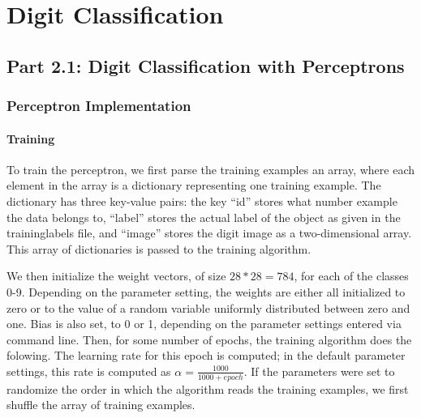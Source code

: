 \section{Digit Classification}
\subsection{Part 2.1: Digit Classification with Perceptrons}
\subsubsection{Perceptron Implementation}
\paragraph{Training}
To train the perceptron, we first parse the training examples an array, where each element in the array is a dictionary representing one training example. The dictionary has three key-value pairs: the key ``id'' stores what number example the data belongs to, ``label'' stores the actual label of the object as given in the traininglabels file, and ``image'' stores the digit image as a two-dimensional array. This array of dictionaries is passed to the training algorithm.

We then initialize the weight vectors, of size $28*28=784$, for each of the classes 0-9. Depending on the parameter setting, the weights are either all initialized to zero or to the value of a random variable uniformly distributed between zero and one. Bias is also set, to 0 or 1, depending on the parameter settings entered via command line. Then, for some number of epochs, the training algorithm does the folowing. The learning rate for this epoch is computed; in the default parameter settings, this rate is computed as $\alpha = \frac{1000}{1000+epoch}$. If the parameters were set to randomize the order in which the algorithm reads the training examples, we first shuffle the array of training examples.


